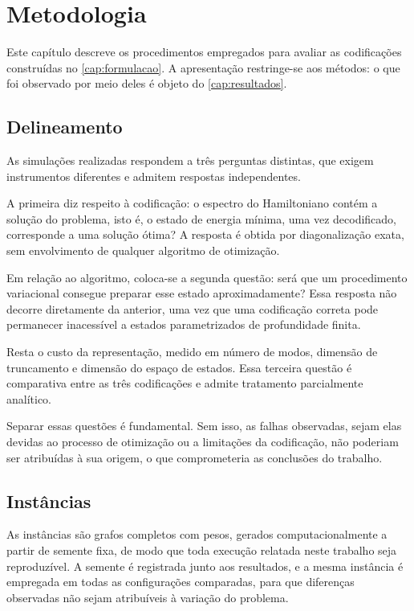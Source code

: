 \chapter{Metodologia} \label{cap:proposta}

    Este capítulo descreve os procedimentos empregados para avaliar as codificações construídas no \autoref{cap:formulacao}. A apresentação restringe-se aos métodos: o que foi observado por meio deles é objeto do \autoref{cap:resultados}.

\section{Delineamento}\label{sec:met_delineamento}

    As simulações realizadas respondem a três perguntas distintas, que exigem instrumentos diferentes e admitem respostas independentes.

    A primeira diz respeito à codificação: o espectro do Hamiltoniano contém a solução do problema, isto é, o estado de energia mínima, uma vez decodificado, corresponde a uma solução ótima? A resposta é obtida por diagonalização exata, sem envolvimento de qualquer algoritmo de otimização.

    Em relação ao algoritmo, coloca-se a segunda questão: será que um procedimento variacional consegue preparar esse estado aproximadamente? Essa resposta não decorre diretamente da anterior, uma vez que uma codificação correta pode permanecer inacessível a estados parametrizados de profundidade finita.

    Resta o custo da representação, medido em número de modos, dimensão de truncamento e dimensão do espaço de estados. Essa terceira questão é comparativa entre as três codificações e admite tratamento parcialmente analítico.

    Separar essas questões é fundamental. Sem isso, as falhas observadas, sejam elas devidas ao processo de otimização ou a limitações da codificação, não poderiam ser atribuídas à sua origem, o que comprometeria as conclusões do trabalho.

\section{Instâncias}\label{sec:met_instancias}

    As instâncias são grafos completos com pesos, gerados computacionalmente a partir de semente fixa, de modo que toda execução relatada neste trabalho seja reproduzível. A semente é registrada junto aos resultados, e a mesma instância é empregada em todas as configurações comparadas, para que diferenças observadas não sejam atribuíveis à variação do problema.

